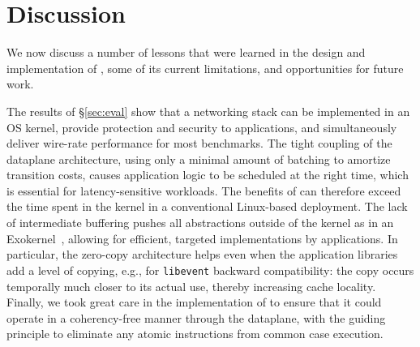 
\section{Discussion}
\label{sec:disc}

We now discuss a number of lessons that were learned in the design and
implementation of \ix, some of its current limitations, and
opportunities for future work.

 The results of \S\ref{sec:eval}
show that a networking stack can be implemented in an OS kernel,
provide protection and security to applications, and simultaneously
deliver wire-rate performance for most benchmarks.  The tight coupling
of the dataplane architecture, using only a minimal amount of batching
to amortize transition costs, causes application logic to be scheduled
at the right time, which is essential for latency-sensitive workloads.
The benefits of \ix can therefore exceed the time spent in the kernel
in a conventional Linux-based deployment.  The lack of intermediate
buffering pushes all abstractions outside of the kernel as in an
Exokernel~\cite{DBLP:conf/sosp/EnglerKO95}, allowing for efficient,
targeted implementations by applications.  In particular, the
zero-copy architecture helps even when the application libraries add a
level of copying, e.g., for \texttt{libevent} backward compatibility:
the copy occurs temporally much closer to its actual use, thereby
increasing cache locality.  Finally, we took great care in the
implementation of \ix to ensure that it could operate in a
coherency-free manner through the dataplane, with the guiding
principle to eliminate any atomic instructions from common case
execution.




